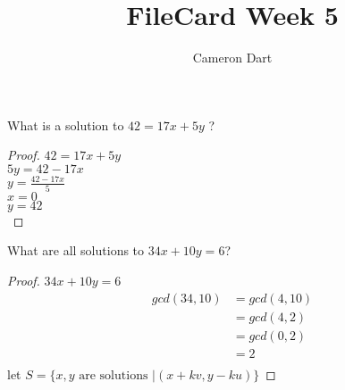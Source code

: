 \documentclass[12pt]{article}
\newenvironment{question}[2][Question]{\begin{trivlist}
\item[\hskip \labelsep {\bfseries #1}\hskip \labelsep {\bfseries #2.}]}{\end{trivlist}}
\begin{document}
 
 
\title{FileCard Week 5}
\author{Cameron Dart}
\maketitle
 
\begin{question}{1}
What is a solution to $42=17x+5y$ ?
\end{question}

\begin{proof}
$42=17x+5y$\\
$5y=42-17x$\\
$y=\frac{42-17x}{5}$\\
$x=0$\\
$y=42$\\
\end{proof}

\begin{question}{2}
What are all solutions to $34x+10y=6$?	
\end{question}

\begin{proof}
$34x+10y=6$\\
\begin{align}
gcd(34,10) &= gcd(4,10) \\
& = gcd(4,2) \\
& = gcd(0,2) \\ 
& = 2\\
\end{align}
let $S = \{ x,y \text{ are solutions } | (x+kv, y-ku) \}$
\end{proof}
\end{document}
